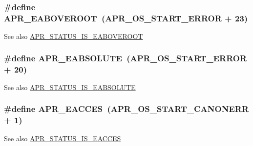 \subsubsection[{\texorpdfstring{A\+P\+R\+\_\+\+E\+A\+B\+O\+V\+E\+R\+O\+OT}{APR_EABOVEROOT}}]{\setlength{\rightskip}{0pt plus 5cm}\#define A\+P\+R\+\_\+\+E\+A\+B\+O\+V\+E\+R\+O\+OT~({\bf A\+P\+R\+\_\+\+O\+S\+\_\+\+S\+T\+A\+R\+T\+\_\+\+E\+R\+R\+OR} + 23)}\hypertarget{group__APR__Error_ga4828cc04f97dc7bed691456adf7c073e}{}\label{group__APR__Error_ga4828cc04f97dc7bed691456adf7c073e}
\begin{DoxySeeAlso}{See also}
\hyperlink{group__APR__STATUS__IS_gae89b8de1e40b855cf95987ce5947b442}{A\+P\+R\+\_\+\+S\+T\+A\+T\+U\+S\+\_\+\+I\+S\+\_\+\+E\+A\+B\+O\+V\+E\+R\+O\+OT} 
\end{DoxySeeAlso}
\subsubsection[{\texorpdfstring{A\+P\+R\+\_\+\+E\+A\+B\+S\+O\+L\+U\+TE}{APR_EABSOLUTE}}]{\setlength{\rightskip}{0pt plus 5cm}\#define A\+P\+R\+\_\+\+E\+A\+B\+S\+O\+L\+U\+TE~({\bf A\+P\+R\+\_\+\+O\+S\+\_\+\+S\+T\+A\+R\+T\+\_\+\+E\+R\+R\+OR} + 20)}\hypertarget{group__APR__Error_gafd1ffc5bf2bf215ad048780408913d0e}{}\label{group__APR__Error_gafd1ffc5bf2bf215ad048780408913d0e}
\begin{DoxySeeAlso}{See also}
\hyperlink{group__APR__STATUS__IS_gae662804298416a68e63c4f84f245d30c}{A\+P\+R\+\_\+\+S\+T\+A\+T\+U\+S\+\_\+\+I\+S\+\_\+\+E\+A\+B\+S\+O\+L\+U\+TE} 
\end{DoxySeeAlso}
\subsubsection[{\texorpdfstring{A\+P\+R\+\_\+\+E\+A\+C\+C\+ES}{APR_EACCES}}]{\setlength{\rightskip}{0pt plus 5cm}\#define A\+P\+R\+\_\+\+E\+A\+C\+C\+ES~({\bf A\+P\+R\+\_\+\+O\+S\+\_\+\+S\+T\+A\+R\+T\+\_\+\+C\+A\+N\+O\+N\+E\+RR} + 1)}\hypertarget{group__APR__Error_ga407fc0ea7ead60f7a97fb9d70061bd41}{}\label{group__APR__Error_ga407fc0ea7ead60f7a97fb9d70061bd41}
\begin{DoxySeeAlso}{See also}
\hyperlink{group__APR__STATUS__IS_ga61e7a9958689dec6da6279f0cb6073ca}{A\+P\+R\+\_\+\+S\+T\+A\+T\+U\+S\+\_\+\+I\+S\+\_\+\+E\+A\+C\+C\+ES} 
\end{DoxySeeAlso}

